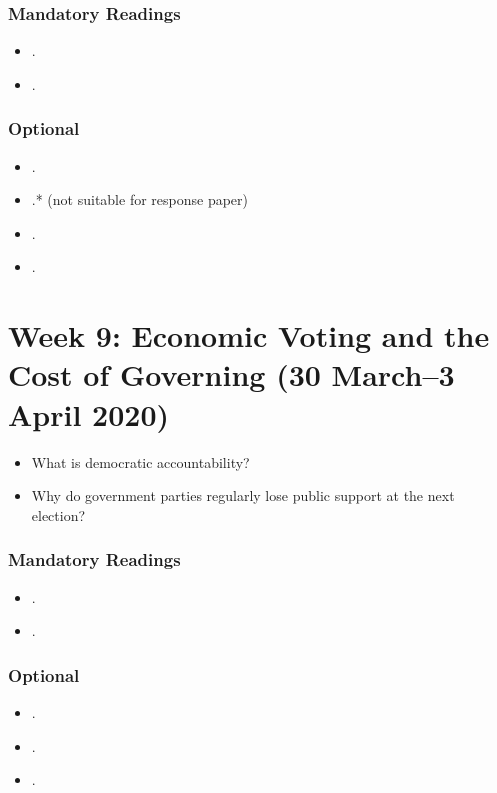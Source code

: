 \documentclass[abstract=on,parskip=full,headings=standardclasses,fontsize=11pt,paper=a4]{scrartcl}
\begin{document}
\subsubsection*{Mandatory Readings}
\begin{itemize}
\item {}.
\item {}.
\end{itemize}

\subsubsection*{Optional}
\begin{itemize}
\item {}.
\item {}.* (not suitable for response paper)
\item {}.
\item {}.
\end{itemize}


\section{Week 9: Economic Voting and the Cost of Governing (30 March--3 April 2020)}


\begin{itemize}
\renewcommand\labelitemi{--}
\item What is democratic accountability?
\item Why do government parties  regularly lose public support at the next election?
\end{itemize}

\subsubsection*{Mandatory Readings}

\begin{itemize}
\item {}.
\item {}.
\end{itemize}

\subsubsection*{Optional}
\begin{itemize}
\item {}.
\item {}.
\item {}.
\end{itemize}
\end{document}
